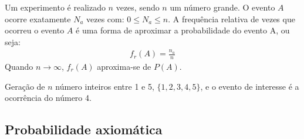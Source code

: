 Um experimento é realizado  $n$ vezes, sendo $n$ um número grande. O evento $A$ ocorre exatamente $N_a$ vezes com: $0 \le N_a \le n$. A frequência relativa de vezes que ocorreu o evento $A$ é uma forma de aproximar a probabilidade do evento A, ou seja:
\begin{align}
  f_r (A)= \frac{n_a}{n} 
\end{align}
Quando $n \to \infty$, $f_r(A)$ aproxima-se de $P(A)$.
\begin{example}
    Geração de $n$ número inteiros entre 1 e 5, $\{ 1,2,3,4,5 \}$, e o evento de interesse é a ocorrência do número 4.
  \end{example}
\subsection{Probabilidade axiomática}

